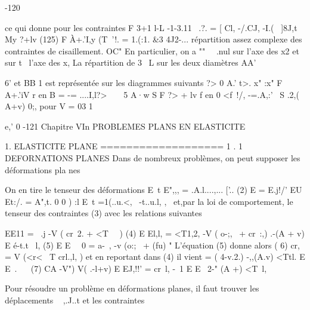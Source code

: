 -120 ­

ce qui donne pour les contraintes 
F 3+1\1 l-L -1-3.11 
~.?. = [ Cl, -/.CJ, -I.(~ ]8J,t My ?+lv
(125) 
F À+.'I,y 
(T~'!. = 1.(:1. &3 
4J2-...\+\1 
répartition assez complexe des contraintes de cisaillement. 
OC" 
En particulier, on a 
"" 
~~.nul sur l'axe des x2 et sur t 
\ 
l'axe des x, La répartition de
3 
~L sur les deux diamètres AA' 


6' 
et BB 1 est représentée sur les diagrammes suivants 
?>
0
A.' t>. x"­
:x" 
F A+.'iV r
en B = -= ....I,l?> ­
~~ 
5 A·w S F ?> + lv f
en 0 <f~!/, -=.A,:'~ S .2,( A+v) 0;, 
pour V = 03
1 

e,' 0 
-121 ­Chapitre VIn 
PROBLEMES PLANS EN ELASTICITE 

1. ELASTICITE PLANE 
=================== 
1 . 1 DEFORNATIONS PLANES Dans de nombreux problèmes, on peut supposer les déformations pla­
nes 

On en tire le tenseur des déformations E~t E",,, = .A.l....,...
['..
(2) 
E = E.j!/' EU Et:/. = A",t. 
0 0 )
:l 
E~t =1(..u.<,~ -t..u.l, ,~ et,par la loi de comportement, le tenseur des contraintes 
(3) 
avec les relations suivantes 

EE11 = ~.j -V ( cr~2. + <T~~ ) 
(4) 
E El,l, = <T1,2, -V ( o-;,~ + cr~:,) 
.-(A + v)
E é-t.t ~l, 
(5) E E~~ 0 = a-~, -v (o:;~ + (fu)
" 
L'équation (5) donne alors 
( 6) 
cr,~ = V (<r<~ T crl.,l, ) 
et en reportant dans (4) il vient 
= ( 4-v.2.) -,,(A.v) <Ttl.
E E~. ~~ 
(7) 
CA -V") V( .-l+v)
E EJ,!!' = cr~l, -~1 E E~ 2-" (A +\1) <T~l, 

Pour résoudre un problème en déformations planes, il faut trouver les déplacements ~ ,.J..t et les contraintes 

